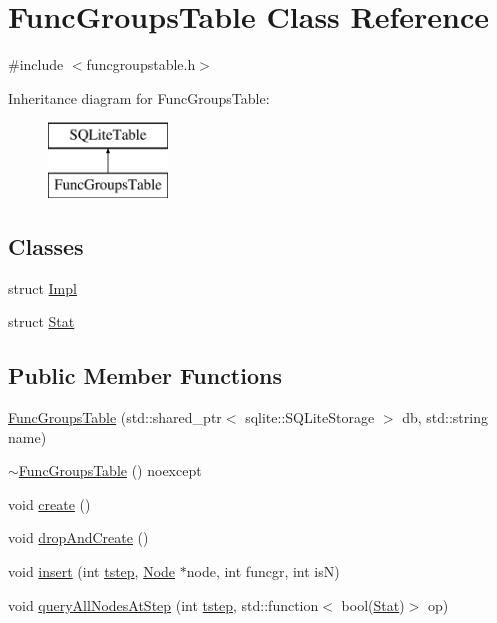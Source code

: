 \hypertarget{class_func_groups_table}{}\section{Func\+Groups\+Table Class Reference}
\label{class_func_groups_table}


{\ttfamily \#include $<$funcgroupstable.\+h$>$}

Inheritance diagram for Func\+Groups\+Table\+:\begin{figure}[H]
\begin{center}
\leavevmode
\includegraphics[height=2.000000cm]{d2/d09/class_func_groups_table}
\end{center}
\end{figure}
\subsection*{Classes}
\begin{DoxyCompactItemize}
\item 
struct \mbox{\hyperlink{struct_func_groups_table_1_1_impl}{Impl}}
\item 
struct \mbox{\hyperlink{struct_func_groups_table_1_1_stat}{Stat}}
\end{DoxyCompactItemize}
\subsection*{Public Member Functions}
\begin{DoxyCompactItemize}
\item 
\mbox{\hyperlink{class_func_groups_table_af62fb106ad32807f2430fc7f02cd419a}{Func\+Groups\+Table}} (std\+::shared\+\_\+ptr$<$ sqlite\+::\+S\+Q\+Lite\+Storage $>$ db, std\+::string name)
\item 
\mbox{\hyperlink{class_func_groups_table_a0625c13b27a86c3b38ee6f3589911283}{$\sim$\+Func\+Groups\+Table}} () noexcept
\item 
void \mbox{\hyperlink{class_func_groups_table_a21eff426b6bb8955bef5d4eace60364e}{create}} ()
\item 
void \mbox{\hyperlink{class_func_groups_table_a6fb0da3510cb7b4d9fb2760fcf447fe6}{drop\+And\+Create}} ()
\item 
void \mbox{\hyperlink{class_func_groups_table_a2d391967ca9afb238e2ccac7a91e0a8e}{insert}} (int \mbox{\hyperlink{thread__vessels_8cpp_a84bc73d278de929ec9974e1a95d9b23a}{tstep}}, \mbox{\hyperlink{class_node}{Node}} $\ast$node, int funcgr, int isN)
\item 
void \mbox{\hyperlink{class_func_groups_table_a5426216ba3d2f42055c29ee7ae7cbe6a}{query\+All\+Nodes\+At\+Step}} (int \mbox{\hyperlink{thread__vessels_8cpp_a84bc73d278de929ec9974e1a95d9b23a}{tstep}}, std\+::function$<$ bool(\mbox{\hyperlink{struct_func_groups_table_1_1_stat}{Stat}})$>$ op)
\end{DoxyCompactItemize}
